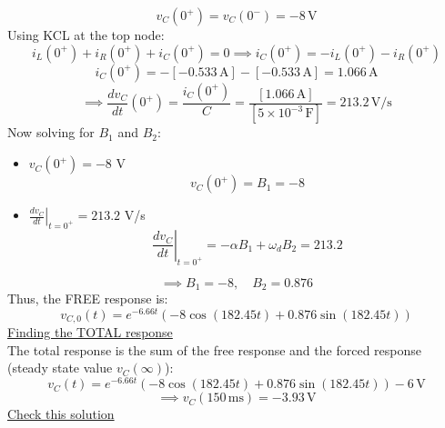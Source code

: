 \documentclass[12pt]{article}
\begin{document}
\[v_C(0^+) = v_C(0^-) = -8\,\text{V}\]
Using KCL at the top node:
\[i_L(0^+) + i_R(0^+) + i_C(0^+) = 0 \implies i_C(0^+) = -i_L(0^+) - i_R(0^+)\]
\[i_C(0^+) = -[-0.533\,\text{A}] - [-0.533\,\text{A}] = 1.066\,\text{A}\]
\[\implies \frac{dv_C}{dt}(0^+) = \frac{i_C(0^+)}{C} = \frac{[1.066\,\text{A}]}{[5\times10^{-3}\,\text{F}]} = 213.2\,\text{V/s}\]
Now solving for $B_1$ and $B_2$:
\begin{itemize}
    \item $v_C(0^+) = -8$ V
    \[v_C(0^+) = B_1 = -8 \]
    \item $\left.\frac{dv_C}{dt}\right|_{t=0^+} = 213.2$ V/s
    \[ \left.\frac{dv_C}{dt}\right|_{t=0^+} = -\alpha B_1 + \omega_d B_2 = 213.2 \]
\end{itemize}
\[\implies B_1 = -8, \quad B_2 = 0.876\]
Thus, the FREE response is:
\[v_{C,0}(t) = e^{-6.66 t}(-8 \cos (182.45 t) + 0.876 \sin (182.45 t))\]
\underline{Finding the TOTAL response}\\
The total response is the sum of the free response and the forced response (steady state value $v_C(\infty)$):
\[\boxed{v_C(t) = e^{-6.66 t}(-8 \cos (182.45 t) + 0.876 \sin (182.45 t)) - 6\,\text{V}}\]
\[\implies \boxed{v_C(150\,\text{ms}) = -3.93\,\text{V}}\]
\underline{Check this solution}
\end{document}

